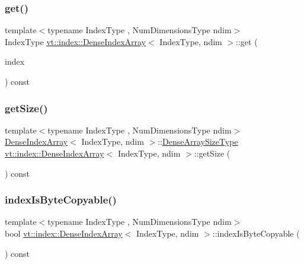 \subsubsection{\texorpdfstring{get()}{get()}}
{\footnotesize\ttfamily template$<$typename Index\+Type , Num\+Dimensions\+Type ndim$>$ \\
Index\+Type \hyperlink{structvt_1_1index_1_1_dense_index_array}{vt\+::index\+::\+Dense\+Index\+Array}$<$ Index\+Type, ndim $>$\+::get (\begin{DoxyParamCaption}\item[{Index\+Type const \&}]{index }\end{DoxyParamCaption}) const}

\mbox{\label{structvt_1_1index_1_1_dense_index_array_a96f8e639c73347b326a31a750a0f9e2d}} 
\subsubsection{\texorpdfstring{get\+Size()}{getSize()}}
{\footnotesize\ttfamily template$<$typename Index\+Type , Num\+Dimensions\+Type ndim$>$ \\
\hyperlink{structvt_1_1index_1_1_dense_index_array}{Dense\+Index\+Array}$<$ Index\+Type, ndim $>$\+::\hyperlink{structvt_1_1index_1_1_dense_index_array_a7a66b5cd270377310119da3d0c884224}{Dense\+Array\+Size\+Type} \hyperlink{structvt_1_1index_1_1_dense_index_array}{vt\+::index\+::\+Dense\+Index\+Array}$<$ Index\+Type, ndim $>$\+::get\+Size (\begin{DoxyParamCaption}{ }\end{DoxyParamCaption}) const}

\mbox{\label{structvt_1_1index_1_1_dense_index_array_a2c47c2a4cb636879e03281d185e19fad}} 
\subsubsection{\texorpdfstring{index\+Is\+Byte\+Copyable()}{indexIsByteCopyable()}}
{\footnotesize\ttfamily template$<$typename Index\+Type , Num\+Dimensions\+Type ndim$>$ \\
bool \hyperlink{structvt_1_1index_1_1_dense_index_array}{vt\+::index\+::\+Dense\+Index\+Array}$<$ Index\+Type, ndim $>$\+::index\+Is\+Byte\+Copyable (\begin{DoxyParamCaption}{ }\end{DoxyParamCaption}) const}

